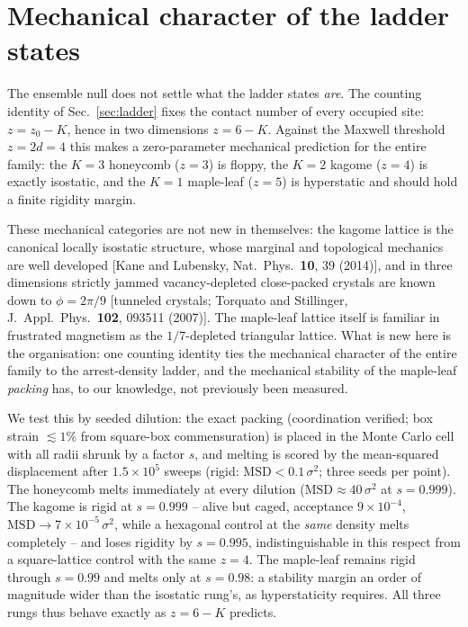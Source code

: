 \documentclass[aps,prl,twocolumn,superscriptaddress,floatfix]{revtex4-2}
\begin{document}
\section{Mechanical character of the ladder states}
\label{sec:mech}

The ensemble null does not settle what the ladder states \emph{are}. The
counting identity of Sec.~\ref{sec:ladder} fixes the contact number of
every occupied site: $z=z_0-K$, hence in two dimensions $z=6-K$. Against
the Maxwell threshold $z=2d=4$ this makes a zero-parameter mechanical
prediction for the entire family: the $K{=}3$ honeycomb ($z{=}3$) is
floppy, the $K{=}2$ kagome ($z{=}4$) is exactly isostatic, and the $K{=}1$
maple-leaf ($z{=}5$) is hyperstatic and should hold a finite rigidity
margin.

These mechanical categories are not new in themselves: the kagome lattice
is the canonical locally isostatic structure, whose marginal and topological
mechanics are well developed [Kane and Lubensky, Nat.\ Phys.\ \textbf{10},
39 (2014)], and in three dimensions strictly jammed vacancy-depleted
close-packed crystals are known down to $\phi=2\pi/9$ [tunneled crystals;
Torquato and Stillinger, J.\ Appl.\ Phys.\ \textbf{102}, 093511 (2007)].
The maple-leaf lattice itself is familiar in frustrated magnetism as the
$1/7$-depleted triangular lattice. What is new here is the organisation:
one counting identity ties the mechanical character of the entire family to
the arrest-density ladder, and the mechanical stability of the maple-leaf
\emph{packing} has, to our knowledge, not previously been measured.

We test this by seeded dilution: the exact packing (coordination verified;
box strain $\lesssim1\%$ from square-box commensuration) is placed in the
Monte Carlo cell with all radii shrunk by a factor $s$, and melting is
scored by the mean-squared displacement after $1.5\times10^5$ sweeps
(rigid: $\mathrm{MSD}<0.1\,\sigma^2$; three seeds per point). The
honeycomb melts immediately at every dilution
($\mathrm{MSD}\approx40\,\sigma^2$ at $s=0.999$). The kagome is rigid at
$s=0.999$ -- alive but caged, acceptance $9\times10^{-4}$,
$\mathrm{MSD}\to7\times10^{-5}\,\sigma^2$, while a hexagonal control at
the \emph{same} density melts completely -- and loses rigidity by
$s=0.995$, indistinguishable in this respect from a square-lattice control
with the same $z=4$. The maple-leaf remains rigid through $s=0.99$ and
melts only at $s=0.98$: a stability margin an order of magnitude wider
than the isostatic rung's, as hyperstaticity requires. All three rungs
thus behave exactly as $z=6-K$ predicts.
\end{document}
